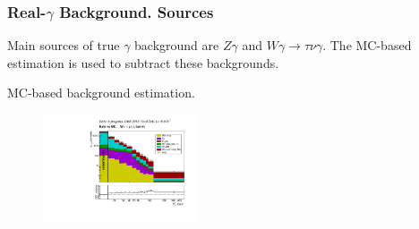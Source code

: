 \begin{frame}\frametitle {Real-$\gamma$ Background. Sources}

Main sources of true $\gamma$ background are $Z\gamma$ and $W\gamma \rightarrow \tau \nu \gamma$. The MC-based estimation is used to subtract these backgrounds.

MC-based background estimation.
  \begin{figure}[htb]
    \begin{center}
       \includegraphics[width=0.40\textwidth]{../figs/figs_v11/MUON_WGamma/PrepareYields/c_TotalDATAvsMC_Barrel__phoEt.pdf}
    \end{center}
  \end{figure}
\end{frame}%

